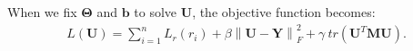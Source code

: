 \documentclass[conference]{IEEEtran}
\begin{document}
When we fix $\bm{\Theta}$ and $\bm{b}$ to solve $\bm{U}$, the objective function becomes:
\begin{equation}
\begin{split}
L(\bm{U})=\sum_{i=1}^nL_r(r_i) + \beta \left\lVert \bm{U} - \bm{Y} \right\rVert_F^2 + \gamma \ tr(\bm{U}^T\bm{M}\bm{U}).\\
\end{split}
\end{equation}
\end{document}
